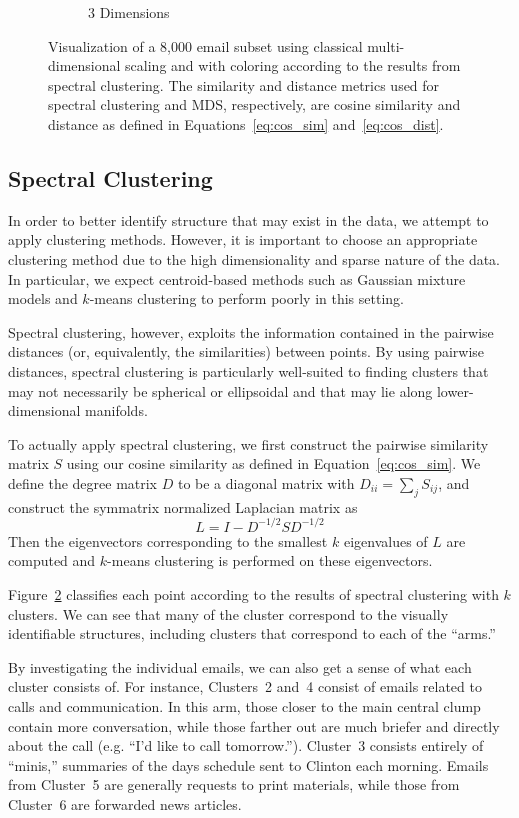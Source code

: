 \documentclass[12pt]{article}
\theoremstyle{definition}
\theoremstyle{algodesc}
\begin{document}
\begin{figure}[htbp]
\begin{subfigure}[t]{.7\linewidth}
    \caption{3 Dimensions} \label{fig:cluster:3d}
  \end{subfigure}
  \caption{Visualization of a 8,000 email subset using classical multi-dimensional scaling and with coloring according to the results from spectral clustering. The similarity and distance metrics used for spectral clustering and MDS, respectively, are cosine similarity and distance as defined in Equations~\ref{eq:cos_sim} and~\ref{eq:cos_dist}.}
  \label{fig:cluster}
\end{figure}


\subsection{Spectral Clustering} \label{sec:spec_cluster}
In order to better identify structure that may exist in the data, we attempt to apply clustering methods. However, it is important to choose an appropriate clustering method due to the high dimensionality and sparse nature of the data. In particular, we expect centroid-based methods such as Gaussian mixture models and $k$-means clustering to perform poorly in this setting.

Spectral clustering, however, exploits the information contained in the pairwise distances (or, equivalently, the similarities) between points. By using pairwise distances, spectral clustering is particularly well-suited to finding clusters that may not necessarily be spherical or ellipsoidal and that may lie along lower-dimensional manifolds.

To actually apply spectral clustering, we first construct the pairwise similarity matrix $S$ using our cosine similarity as defined in Equation~\ref{eq:cos_sim}. We define the degree matrix $D$ to be a diagonal matrix with $D_{ii} = \sum_j S_{ij}$, and construct the symmatrix normalized Laplacian matrix as
\begin{equation} \label{eq:laplacian}
L = I - D^{-1/2} S D^{-1/2}
\end{equation}
Then the eigenvectors corresponding to the smallest $k$ eigenvalues of $L$ are computed and $k$-means clustering is performed on these eigenvectors.

Figure~\ref{fig:cluster} classifies each point according to the results of spectral clustering with $k$ clusters. We can see that many of the cluster correspond to  the visually identifiable structures, including clusters that correspond to each of the ``arms.''

By investigating the individual emails, we can also get a sense of what each cluster consists of. For instance, Clusters~2 and~4 consist of emails related to calls and communication. In this arm, those closer to the main central clump contain more conversation, while those farther out are much briefer and directly about the call (e.g. ``I'd like to call tomorrow.''). Cluster~3 consists entirely of ``minis,'' summaries of the days schedule sent to Clinton each morning. Emails from Cluster~5 are generally requests to print materials, while those from Cluster~6 are forwarded news articles.
\end{document}
